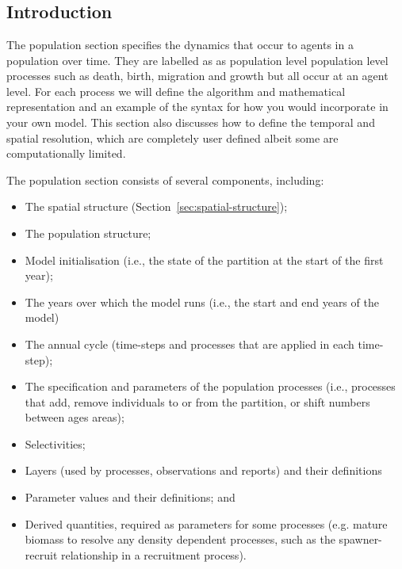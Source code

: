 \section{\label{sec:population-section}}

\subsection{Introduction}
The population section specifies the dynamics that occur to agents in a population over time. They are labelled as as population level population level processes such as death, birth, migration and growth but all occur at an agent level. For each process we will define the algorithm and mathematical representation and an example of the syntax for how you would incorporate in your own model. This section also discusses how to define the temporal and spatial resolution, which are completely user defined albeit some are computationally limited.

The population section consists of several components, including:
\begin{itemize}
  \item The spatial structure (Section~\ref{sec:spatial-structure});
  \item The population structure;
  \item Model initialisation (i.e., the state of the partition at the start of the first year);
  \item The years over which the model runs (i.e., the start and end years of the model)
  \item The annual cycle (time-steps and processes that are applied in each time-step);
  \item The specification and parameters of the population processes (i.e., processes that add, remove individuals to or from the partition, or shift numbers between ages areas);
  \item Selectivities;
  \item Layers (used by processes, observations and reports) and their definitions
  \item Parameter values and their definitions; and
  \item Derived quantities, required as parameters for some processes (e.g. mature biomass to resolve any density dependent processes, such as the spawner-recruit relationship in a recruitment process).
\end{itemize}

